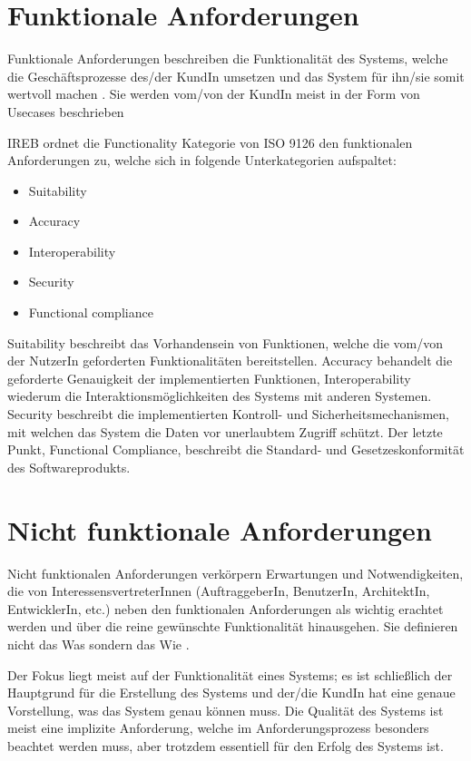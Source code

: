 \section{Funktionale Anforderungen}
Funktionale Anforderungen beschreiben die Funktionalität des Systems, welche die Geschäftsprozesse des/der KundIn umsetzen und das System für ihn/sie somit wertvoll machen \cite[S. 79]{reqanalysis}. Sie werden vom/von der KundIn meist in der Form von Usecases beschrieben \cite[S. 78]{reqanalysis}

IREB ordnet die Functionality Kategorie von ISO 9126 den funktionalen Anforderungen zu\cite[S. 9]{ireb}, welche sich in folgende Unterkategorien aufspaltet:

\begin{itemize}
  \item \glqq Suitability\grqq
  \item \glqq Accuracy\grqq
  \item \glqq Interoperability\grqq
  \item \glqq Security\grqq
  \item \glqq Functional compliance\grqq
\end{itemize}

Suitability beschreibt das Vorhandensein von Funktionen, welche die vom/von der NutzerIn geforderten Funktionalitäten bereitstellen. Accuracy behandelt die geforderte Genauigkeit der implementierten Funktionen, Interoperability wiederum die Interaktionsmöglichkeiten des Systems mit anderen Systemen. Security beschreibt die implementierten Kontroll- und Sicherheitsmechanismen, mit welchen das System die Daten vor unerlaubtem Zugriff schützt. Der letzte Punkt, Functional Compliance, beschreibt die Standard- und Gesetzeskonformität des Softwareprodukts. \cite[S. 8]{ISO_SQ}

\section{Nicht funktionale Anforderungen}
Nicht funktionalen Anforderungen \glqq verkörpern Erwartungen und Notwendigkeiten, die von InteressensvertreterInnen (AuftraggeberIn, BenutzerIn, ArchitektIn, EntwicklerIn, etc.) neben den funktionalen Anforderungen als wichtig erachtet werden und über die reine gewünschte Funktionalität hinausgehen\grqq \cite[S. 108]{softarch}. Sie definieren nicht das Was sondern das Wie \cite[S. 80]{reqanalysis}.

Der Fokus liegt meist auf der Funktionalität eines Systems; es ist schließlich der Hauptgrund für die Erstellung des Systems und der/die KundIn hat eine genaue Vorstellung, was das System genau können muss. Die Qualität des Systems ist meist eine implizite Anforderung, welche im Anforderungsprozess besonders beachtet werden muss, aber trotzdem essentiell für den Erfolg des Systems ist. \cite[S. 109]{softarch}


